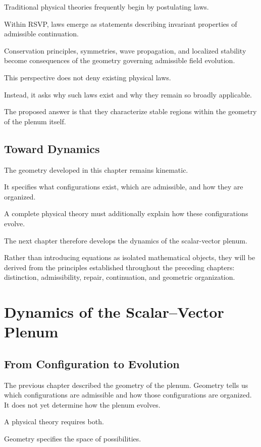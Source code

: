 \documentclass[11pt,oneside]{book}
\numberwithin{equation}{chapter}
\theoremstyle{definition}
\theoremstyle{plain}
\begin{document}
Traditional physical theories frequently begin by postulating laws.

Within RSVP, laws emerge as statements describing invariant properties of
admissible continuation.

Conservation principles, symmetries, wave propagation, and localized
stability become consequences of the geometry governing admissible field
evolution.

This perspective does not deny existing physical laws.

Instead, it asks why such laws exist and why they remain so broadly
applicable.

The proposed answer is that they characterize stable regions within the
geometry of the plenum itself.

\section{Toward Dynamics}

The geometry developed in this chapter remains kinematic.

It specifies what configurations exist, which are admissible, and how they
are organized.

A complete physical theory must additionally explain how these
configurations evolve.

The next chapter therefore develops the dynamics of the scalar-vector
plenum.

Rather than introducing equations as isolated mathematical objects, they
will be derived from the principles established throughout the preceding
chapters: distinction, admissibility, repair, continuation, and geometric
organization.

\chapter{Dynamics of the Scalar--Vector Plenum}

\section{From Configuration to Evolution}

The previous chapter described the geometry of the plenum. Geometry tells us
which configurations are admissible and how those configurations are
organized. It does not yet determine how the plenum evolves.

A physical theory requires both.

Geometry specifies the space of possibilities.
\end{document}

